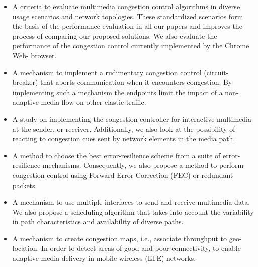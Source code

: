 \begin{itemize}
\setlength{\itemsep}{0pt}

\item A criteria to evaluate multimedia congestion control algorithms in
diverse usage scenarios and network topologies. These standardized scenarios
form the basis of the performance evaluation in all our papers and improves
the process of comparing our proposed solutions. We also evaluate the
performance of the congestion control currently implemented by the Chrome Web-
browser.

\item A mechanism to implement a rudimentary congestion control (circuit-
breaker) that aborts communication when it encounters congestion. By
implementing such a mechanism the endpoints limit the impact of a non-adaptive
media flow on other elastic traffic.

\item A study on implementing the congestion controller for interactive
multimedia at the sender, or receiver.  Additionally, we also look at the
possibility of reacting to congestion cues sent by network elements in the
media path.

\item A method to choose the best error-resilience scheme from a suite of
error-resilience mechanisms. Consequently, we also propose a method to perform
congestion control using Forward Error Correction (FEC) or redundant packets.

\item A mechanism to use multiple interfaces to send and receive multimedia
data. We also propose a scheduling algorithm that takes into account the
variability in path characteristics and availability of diverse paths. 

\item A mechanism to create congestion maps, i.e., associate throughput to 
geo-location. In order to detect areas of good and poor connectivity, to 
enable adaptive media delivery in mobile wireless (LTE) networks.


\end{itemize}
